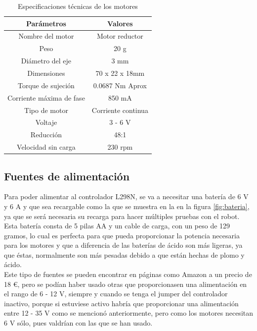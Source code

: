 \begin{table}[H]
\begin{center}
\begin{tabular}{|c|c|}
\hline
\textbf{Parámetros} & \textbf{Valores} \\
\hline

Nombre del motor & Motor reductor \\
Peso & 20 g \\  
Diámetro del eje & 3 mm \\   
Dimensiones & 70 x 22 x 18mm \\   
Torque de sujeción & 0.0687 Nm Aprox \\
Corriente máxima de fase & 850 mA \\  
Tipo de motor & Corriente continua \\   
Voltaje & 3 - 6 V \\  
Reducción & 48:1 \\ 
Velocidad sin carga & 230 rpm \\ 


\hline
\end{tabular}
\caption{Especificaciones técnicas de los motores}
\label{cuadro:ejemplo}
\end{center}
\end{table}


\subsection{Fuentes de alimentación}
\label{subsec:fuentes_alimentacion}

Para poder alimentar al controlador L298N, se va a necesitar una batería de 6 V y 6 A y que sea recargable como la que se muestra en la 
en la figura \ref{fig:bateria}, ya que se será necesaria su recarga para hacer múltiples pruebas con el robot. Esta batería consta de 5 pilas AA y un cable de carga, con un peso de 129 gramos, lo cual es perfecta para que pueda proporcionar la potencia necesaria para los motores y que a diferencia de las baterías de ácido son más ligeras, ya que éstas, normalmente son más pesadas debido a que están hechas de plomo y ácido.\\

Este tipo de fuentes se pueden encontrar en páginas como Amazon a un precio de 18 \euro, pero se podían haber usado otras que proporcionasen una alimentación en el rango de 6 - 12 V, siempre y cuando se tenga el jumper del controlador inactivo, porque si estuviese activo habría que proporcionar una alimentación entre 12 - 35 V como se mencionó anteriormente, pero como los motores necesitan 6 V sólo, pues valdrían con las que se han usado. \\

